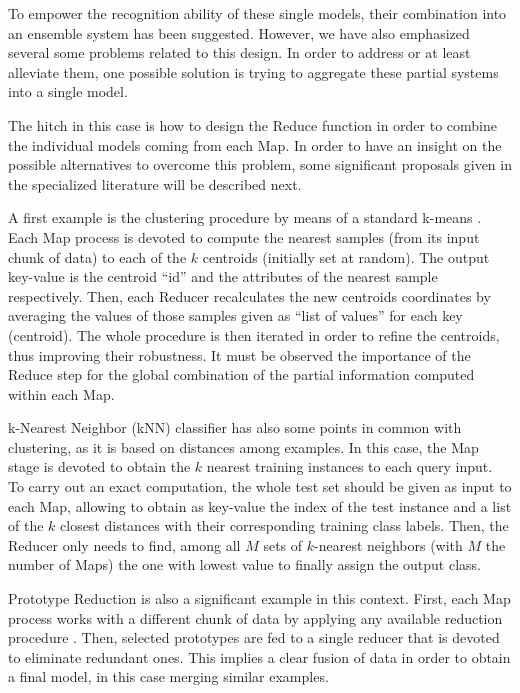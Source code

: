 \documentclass[3p,review]{elsarticle}
\begin{document}
To empower the recognition ability of these single models, their combination into an ensemble system has been suggested. However, we have also emphasized several some problems related to this design. In order to address or at least alleviate them, one possible solution is trying to aggregate these partial systems into a single model. 

The hitch in this case is how to design the Reduce function in order to combine the individual models coming from each Map. In order to have an insight on the possible alternatives to overcome this problem, some significant proposals given in the specialized literature will be described next.

A first example is the clustering procedure by means of a standard k-means \cite{Zhao09-kMeans}. Each Map process is devoted to compute the nearest samples (from its input chunk of data) to each of the $k$ centroids (initially set at random). The output key-value is the centroid ``id'' and the attributes of the nearest sample respectively. Then, each Reducer recalculates the new centroids coordinates by averaging the values of those samples given as ``list of values'' for each key (centroid). The whole procedure is then iterated in order to refine the centroids, thus improving their robustness. It must be observed the importance of the Reduce step for the global combination of the partial information computed within each Map.  

k-Nearest Neighbor (kNN) classifier \cite{MailloRTH17-kNN} has also some points in common with clustering, as it is based on distances among examples. In this case, the Map stage is devoted to obtain the $k$ nearest training instances to each query input. To carry out an exact computation, the whole test set should be given as input to each Map, allowing to obtain as key-value the index of the test instance and a list of the $k$ closest distances with their corresponding training class labels. Then, the Reducer only needs to find, among all $M$ sets of $k$-nearest neighbors (with $M$ the number of Maps) the one with lowest value to finally assign the output class.

Prototype Reduction \cite{TrigueroPBGH15-PR} is also a significant example in this context. First, each Map process works with a different chunk of data by applying any available reduction procedure \cite{TrigueroDGH12}. Then, selected prototypes are fed to a single reducer that is devoted to eliminate redundant ones. This implies a clear fusion of data in order to obtain a final model, in this case merging similar examples. 
\end{document}
